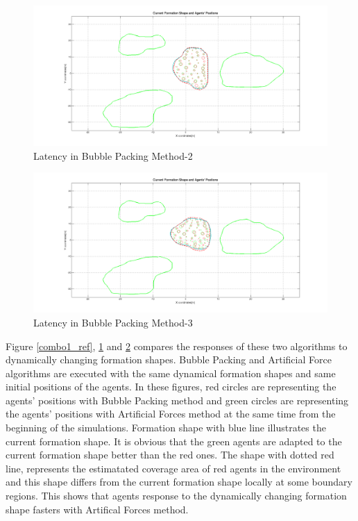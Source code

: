 \begin{figure}[H]
\caption{Latency in Bubble Packing Method-2} \label{combo2_ref}
\centerline{\includegraphics[scale = 0.35]{combo2}}
\end{figure} 

\begin{figure}[H]
\caption{Latency in Bubble Packing Method-3} \label{combo3_ref}
\centerline{\includegraphics[scale = 0.35]{combo3}}
\end{figure} 

Figure \ref{combo1_ref}, \ref{combo2_ref} and \ref{combo3_ref} compares the responses of these two algorithms to dynamically changing formation shapes. Bubble Packing and Artificial Force algorithms are executed with the same dynamical formation shapes and same initial positions of the agents. In these figures, red circles are representing the agents' positions with Bubble Packing method and green circles are representing the agents' positions with Artificial Forces method at the same time from the beginning of the simulations. Formation shape with blue line illustrates the current formation shape. It is obvious that the green agents are adapted to the current formation shape better than the red ones. The shape with dotted red line, represents the estimatated coverage area of red agents in the environment and this shape differs from the current formation shape locally at some boundary regions. This shows that agents response to the dynamically changing formation shape fasters with Artifical Forces method. 

